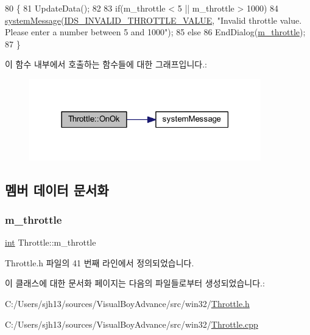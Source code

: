 \begin{DoxyCode}
80 \{
81   UpdateData();
82 
83   \textcolor{keywordflow}{if}(m\_throttle < 5 || m\_throttle > 1000)
84     \mbox{\hyperlink{system_8cpp_a747a9cb8e015a3d45cca636b5bd0fc69}{systemMessage}}(\mbox{\hyperlink{resource_8h_adcc62f18f7b427c2dbf32e08589f19aa}{IDS\_INVALID\_THROTTLE\_VALUE}}, \textcolor{stringliteral}{"Invalid throttle
       value. Please enter a number between 5 and 1000"});
85   \textcolor{keywordflow}{else}
86     EndDialog(\mbox{\hyperlink{class_throttle_aba71c48b95cd2a114625ebb3db55bc0b}{m\_throttle}});
87 \}
\end{DoxyCode}
이 함수 내부에서 호출하는 함수들에 대한 그래프입니다.\+:
\nopagebreak
\begin{figure}[H]
\begin{center}
\leavevmode
\includegraphics[width=285pt]{class_throttle_ae8947386977fc3c1e47bea6f3ddb07b8_cgraph}
\end{center}
\end{figure}


\subsection{멤버 데이터 문서화}
\mbox{\label{class_throttle_aba71c48b95cd2a114625ebb3db55bc0b}} 
\subsubsection{\texorpdfstring{m\+\_\+throttle}{m\_throttle}}
{\footnotesize\ttfamily \mbox{\hyperlink{_util_8cpp_a0ef32aa8672df19503a49fab2d0c8071}{int}} Throttle\+::m\+\_\+throttle}



Throttle.\+h 파일의 41 번째 라인에서 정의되었습니다.



이 클래스에 대한 문서화 페이지는 다음의 파일들로부터 생성되었습니다.\+:\begin{DoxyCompactItemize}
\item 
C\+:/\+Users/sjh13/sources/\+Visual\+Boy\+Advance/src/win32/\mbox{\hyperlink{_throttle_8h}{Throttle.\+h}}\item 
C\+:/\+Users/sjh13/sources/\+Visual\+Boy\+Advance/src/win32/\mbox{\hyperlink{_throttle_8cpp}{Throttle.\+cpp}}\end{DoxyCompactItemize}
